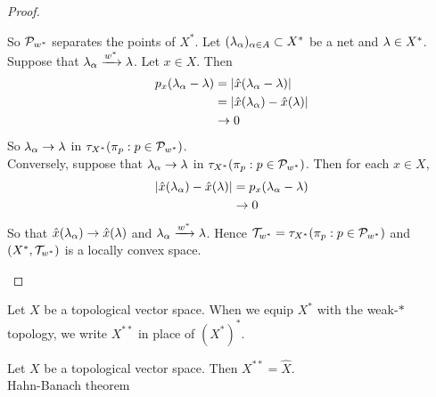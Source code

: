 \documentclass{book}
\begin{document}
\begin{proof}
\begin{enumerate}
			So $\mathcal{P}_{w^*}$ separates the points of $X^*$. Let $(\lambda_{\alpha})_{\alpha \in A} \subset X^*$ be a net and $\lambda \in X^*$. Suppose that $\lambda_{\alpha} \xrightarrow{w^*} \lambda$. Let $x \in X$. Then 
			\begin{align*}
				p_x(\lambda_{\alpha} - \lambda) 
				&= |\hat{x}(\lambda_{\alpha} - \lambda)| \\
				&= |\hat{x}(\lambda_{\alpha}) - \hat{x}(\lambda)| \\
				& \rightarrow 0
			\end{align*}
			So $\lambda_{\alpha} \rightarrow \lambda$ in $\tau_{X^*}(\pi_p: p \in \mathcal{P}_{w^*})$. \\
			Conversely, suppose that $\lambda_{\alpha} \rightarrow \lambda $ in $\tau_{X^*}(\pi_p: p \in \mathcal{P}_{w^*})$. Then for each $x \in X$,
			\begin{align*}
				|\hat{x}(\lambda_{\alpha}) - \hat{x}(\lambda)|
				&= p_x(\lambda_{\alpha} - \lambda) \\
				& \rightarrow 0
			\end{align*}
			So that $\hat{x}(\lambda_{\alpha}) \rightarrow \hat{x}(\lambda)$ and $\lambda_{\alpha} \xrightarrow{w^*} \lambda$. Hence $\mathcal{T}_{w^*} = \tau_{X^*}(\pi_p: p \in \mathcal{P}_{w^*})$ and $(X^*, \mathcal{T}_{w^*})$ is a locally convex space.  
		\end{enumerate}
	\end{proof}

	\begin{note}
		Let $X$ be a topological vector space. When we equip $X^*$ with the weak-$*$ topology, we write $X^{**}$ in place of $(X^*)^*$.
	\end{note}
	
	
	\begin{ex} \lex{}
		Let $X$ be a topological vector space. Then $X^{**} = \hat{X}$. \\
		 Hahn-Banach theorem
	\end{ex}
	
\end{document}
